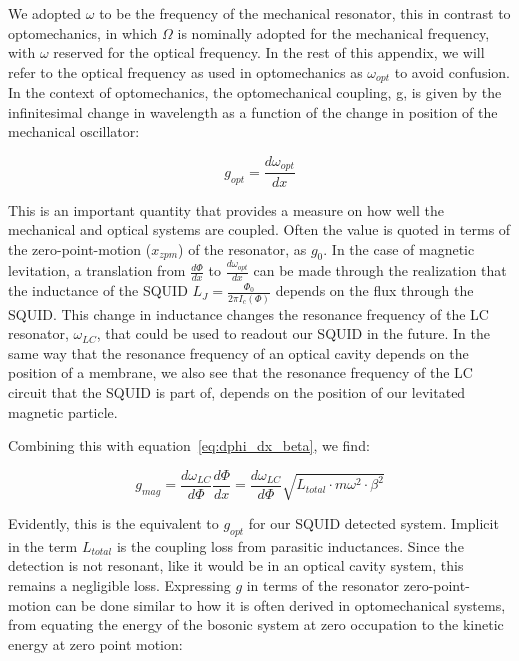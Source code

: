 \begin{appendices}
We adopted $\omega$ to be the frequency of the mechanical resonator, this in contrast to optomechanics, in which $\Omega$ is nominally adopted for the mechanical frequency, with $\omega$ reserved for the optical frequency. In the rest of this appendix, we will refer to the optical frequency as used in optomechanics as $\omega_{opt}$ to avoid confusion.
In the context of optomechanics, the optomechanical coupling, g, is given by the infinitesimal change in wavelength as a function of the change in position of the mechanical oscillator:

    \begin{equation}
        g_{opt} = \frac{d\omega_{opt}}{dx}
    \end{equation}

This is an important quantity that provides a measure on how well the mechanical and optical systems are coupled. Often the value is quoted in terms of the zero-point-motion ($x_{zpm}$) of the resonator, as $g_0$.
In the case of magnetic levitation, a translation from  $\frac{d\Phi}{dx}$ to $\frac{d\omega_{opt}}{dx}$ can be made through the realization that the inductance of the SQUID $L_J=\frac{\Phi_0}{2 \pi I_c(\Phi)}$ depends on the flux through the SQUID. This change in inductance changes the resonance frequency of the LC resonator, $\omega_{LC}$, that could be used to readout our SQUID in the future. In the same way that the resonance frequency of an optical cavity depends on the position of a membrane, we also see that the resonance frequency of the LC circuit that the SQUID is part of, depends on the position of our levitated magnetic particle. 

Combining this with equation~\ref{eq:dphi_dx_beta}, we find:

\begin{equation}
    g_{mag} = \frac{d\omega_{LC}}{d\Phi} \frac{d\Phi}{dx} = \frac{d\omega_{LC}}{d\Phi} \sqrt{L_{total}\cdot m\omega^2\cdot \beta^2}
\end{equation}

Evidently, this is the equivalent to $g_{opt}$ for our SQUID detected system. Implicit in the term $L_{total}$ is the coupling loss from parasitic inductances. 
Since the detection is not resonant, like it would be in an optical cavity system, this remains a negligible loss. 
Expressing $g$ in terms of the resonator zero-point-motion can be done similar to how it is often derived in optomechanical systems, from equating the energy of the bosonic system at zero occupation to the kinetic energy at zero point motion:


\end{appendices}
